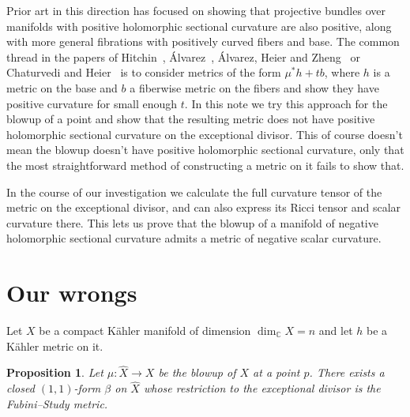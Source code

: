 \documentclass[10pt,a4paper]{amsart}
\newtheorem{prop}[theo]{Proposition}
\newcommand{\kk}[1]{\mathbb{#1}}
\def\hsc{holomorphic sectional curvature}
\def\bl#1{\widehat{#1}}
\def\blX{\bl{X}}
\begin{document}
Prior art in this direction has focused on showing that projective bundles
over manifolds with positive \hsc{} are also positive, along with more
general fibrations with positively curved fibers and base.
The common thread in the papers of
Hitchin~\cite{hitchin1975curvature},
\'Alvarez~\cite{alvarez2016positive},
\'Alvarez,
Heier and Zheng~\cite{alvarez2018projectivized} or Chaturvedi and
Heier~\cite{chaturvedi2020hermitian}
is to consider metrics of the form $\mu^* h + t b$, where $h$ is a metric
on the base and $b$ a fiberwise metric on the fibers and show they have
positive curvature for small enough $t$.
In this note we try this approach for the blowup of a point and show that
the resulting metric does not have positive \hsc{} on the exceptional divisor.
This of course doesn't mean the blowup doesn't have positive \hsc{}, only that
the most straightforward method of constructing a metric on it fails to show that.

In the course of our investigation we calculate the full curvature tensor of
the metric on the exceptional divisor, and can also express its Ricci tensor
and scalar curvature there.
This lets us prove that the blowup of a manifold of negative \hsc{} admits a
metric of negative scalar curvature.




\section{Our wrongs}

Let $X$ be a compact K\"ahler manifold of dimension $\dim_{\kk C} X = n$
and let $h$ be a K\"ahler metric on it.


\begin{prop}
\label{prop:fs}
Let $\mu : \bl X \to X$ be the blowup of $X$ at a point $p$.
There exists a closed $(1,1)$-form $\beta$ on $\blX$ whose restriction to
the exceptional divisor is the Fubini--Study metric.
\end{prop}
\end{document}

